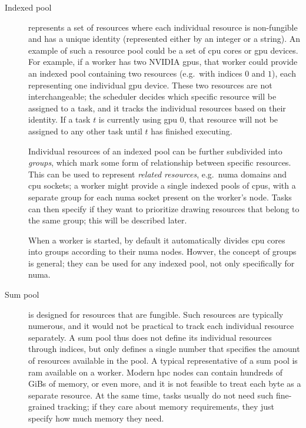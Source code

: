 \begin{description}
	\item [Indexed pool] represents a set of resources where each individual resource is
	      non-fungible and has a unique identity (represented either by an integer or a string). An example
	      of such a resource pool could be a set of \gls{cpu} cores or \gls{gpu}
	      devices. For example, if a worker has two NVIDIA \glspl{gpu}, that worker could provide
	      an indexed pool containing two resources (e.g.\ with indices $0$ and
	      $1$), each representing one individual \gls{gpu} device. These two
	      resources are not interchangeable; the scheduler decides which specific resource will be assigned
	      to a task, and it tracks the individual resources based on their identity. If a task
	      $t$ is currently using \gls{gpu} $0$, that
	      resource will not be assigned to any other task until $t$ has finished
	      executing.

	      Individual resources of an indexed pool can be further subdivided into \emph{groups},
	      which mark some form of relationship between specific resources. This can be used to represent
	      \emph{related resources}, e.g.\ \gls{numa} domains and \gls{cpu} sockets; a
	      worker might provide a single indexed pools of \glspl{cpu}, with a separate group for
	      each \gls{numa} socket present on the worker's node. Tasks can then specify if they
	      want to prioritize drawing resources that belong to the same group; this will be described later.

	      When a worker is started, by default it automatically divides \gls{cpu} cores into
	      groups according to their \gls{numa} nodes. Howver, the concept of groups is general;
	      they can be used for any indexed pool, not only specifically for \gls{numa}.
	\item [Sum pool] is designed for resources that are fungible. Such resources are typically
	      numerous, and it would not be practical to track each individual resource separately. A sum pool
	      thus does not define its individual resources through indices, but only defines a single number
	      that specifies the amount of resources available in the pool. A typical representative of a sum
	      pool is \gls{ram} available on a worker. Modern \gls{hpc} nodes can
	      contain hundreds of GiBs of memory, or even more, and it is not feasible to treat each byte as a
	      separate resource. At the same time, tasks usually do not need such fine-grained tracking; if they
	      care about memory requirements, they just specify how much memory they need.
\end{description}

